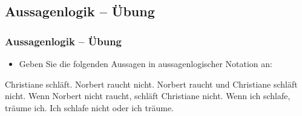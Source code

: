 %
\subsection{Aussagenlogik -- Übung}

%
%
%
%
\begin{frame}
\frametitle{Aussagenlogik -- Übung}

\begin{itemize}
	\item Geben Sie die folgenden Aussagen in aussagenlogischer Notation an:
\end{itemize}

\ea\label{ex:Form1} Christiane schläft. 
\ex\label{ex:Form2} Norbert raucht nicht. 
\ex\label{ex:Form3} Norbert raucht und Christiane schläft nicht. 
\ex\label{ex:Form4} Wenn Norbert nicht raucht, schläft Christiane nicht. 
\ex\label{ex:Form5} Wenn ich schlafe, träume ich. 
\ex\label{ex:Form6} Ich schlafe nicht oder ich träume.
\z 

\end{frame}
	
